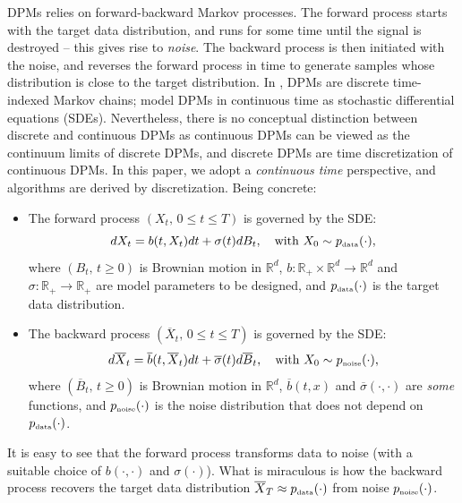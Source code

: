 \documentclass[letterpaper,11pt,reqno]{amsart}
\numberwithin{equation}{section}
\begin{document}
\quad DPMs relies on forward-backward Markov processes.
The forward process starts with the target data distribution, 
and runs for some time until the signal is destroyed --
this gives rise to {\em noise}. 
The backward process is then initiated with the noise, 
and reverses the forward process in time to generate samples
whose distribution is close to the target distribution.
In \cite{Song19, Ho20, Austin21}, DPMs are discrete time-indexed Markov chains;
\cite{Song20, Song21, Chen23} model DPMs in continuous time as 
stochastic differential equations (SDEs).
Nevertheless,
there is no conceptual distinction between discrete and continuous DPMs
as continuous DPMs can be viewed as the continuum limits of discrete DPMs,
and discrete DPMs are time discretization of continuous DPMs.
In this paper, we adopt a {\em continuous time} perspective,
and algorithms are derived by discretization.
Being concrete:
\begin{itemize}[itemsep = 3 pt]
\item
The forward process $(X_t, \, 0 \le t \le T)$ is governed by the SDE:
\begin{equation*}
dX_t = b(t,X_t)  dt + \sigma (t) dB_t, \quad \mbox{with } X_0  \sim p_{\tiny \mbox{data}}(\cdot),
\end{equation*}
where $(B_t, \, t \ge 0)$ is Brownian motion in $\mathbb{R}^d$, 
$b: \mathbb{R}_+ \times \mathbb{R}^d \to \mathbb{R}^d$ and 
 $\sigma: \mathbb{R}_+  \to \mathbb{R}_+$
are model parameters to be designed,
and $p_{\tiny \mbox{data}}(\cdot)$ is the target data distribution.
\item
The backward process $(\overline{X}_t, \, 0 \le t \le T)$ is governed by the SDE:
\begin{equation*}
d\overline{X}_t = \overline{b}(t, \overline{X}_t) dt + \overline{\sigma} (t)  d\overline{B}_t, \quad \mbox{with } X_0  \sim p_{\tiny \mbox{noise}}(\cdot),
\end{equation*}
where $(\overline{B}_t, \, t \ge 0)$ is Brownian motion in $\mathbb{R}^d$,
$\overline{b}(t,x)$ and $\overline{\sigma}(\cdot,\cdot)$ are {\em some} functions,
and $p_{\tiny \mbox{noise}}(\cdot)$ is the noise distribution that does not depend on $p_{\tiny \mbox{data}}(\cdot)$.
\end{itemize}
It is easy to see that the forward process transforms data
to noise (with a suitable choice of $b(\cdot, \cdot)$ and $\sigma(\cdot)$).
What is miraculous is how the backward process recovers the target data distribution 
$\overline{X}_T \approx p_{\tiny \mbox{data}}(\cdot)$ from noise $p_{\tiny \mbox{noise}}(\cdot)$.
\end{document}
